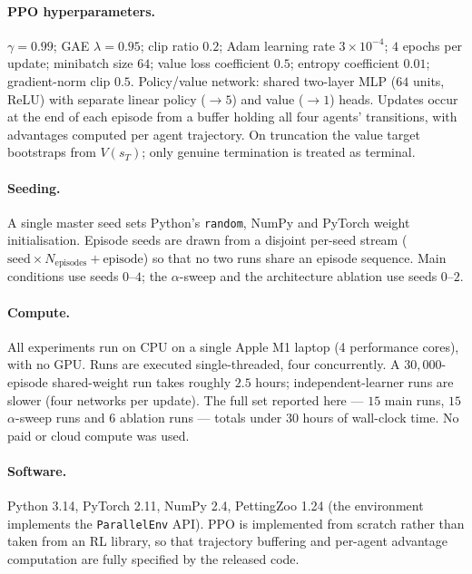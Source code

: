 \documentclass[sigconf,nonacm,anonymous,review]{acmart}
\begin{document}
\paragraph{PPO hyperparameters.} $\gamma=0.99$; GAE $\lambda=0.95$; clip ratio $0.2$;
Adam learning rate $3\times10^{-4}$; $4$ epochs per update; minibatch size $64$; value loss
coefficient $0.5$; entropy coefficient $0.01$; gradient-norm clip $0.5$. Policy/value network:
shared two-layer MLP ($64$ units, ReLU) with separate linear policy ($\rightarrow 5$) and value
($\rightarrow 1$) heads. Updates occur at the end of each episode from a buffer holding all
four agents' transitions, with advantages computed per agent trajectory. On truncation the
value target bootstraps from $V(s_T)$; only genuine termination is treated as terminal.

\paragraph{Seeding.} A single master seed sets Python's \texttt{random}, NumPy and PyTorch
weight initialisation. Episode seeds are drawn from a disjoint per-seed stream
($\text{seed}\times N_{\text{episodes}} + \text{episode}$) so that no two runs share an episode
sequence. Main conditions use seeds $0$--$4$; the $\alpha$-sweep and the architecture ablation
use seeds $0$--$2$.

\paragraph{Compute.} All experiments run on CPU on a single Apple M1 laptop (4 performance
cores), with no GPU. Runs are executed single-threaded, four concurrently. A $30{,}000$-episode
shared-weight run takes roughly $2.5$ hours; independent-learner runs are slower (four networks
per update). The full set reported here --- $15$ main runs, $15$ $\alpha$-sweep runs and $6$
ablation runs --- totals under $30$ hours of wall-clock time. No paid or cloud compute was used.

\paragraph{Software.} Python 3.14, PyTorch 2.11, NumPy 2.4, PettingZoo 1.24 (the environment
implements the \texttt{ParallelEnv} API). PPO is implemented from scratch rather than taken
from an RL library, so that trajectory buffering and per-agent advantage computation are fully
specified by the released code.
\end{document}
